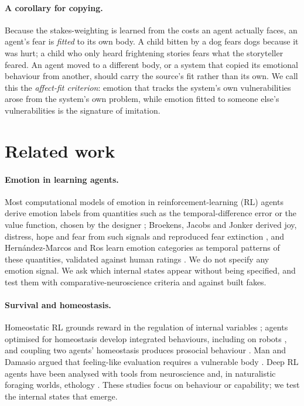 \documentclass[11pt]{article}
\begin{document}
\paragraph{A corollary for copying.} Because the stakes-weighting is learned from the costs an agent actually faces, an agent's fear is \emph{fitted} to its own body. A child bitten by a dog fears dogs because it was hurt; a child who only heard frightening stories fears what the storyteller feared. An agent moved to a different body, or a system that copied its emotional behaviour from another, should carry the source's fit rather than its own. We call this the \emph{affect-fit criterion}: emotion that tracks the system's own vulnerabilities arose from the system's own problem, while emotion fitted to someone else's vulnerabilities is the signature of imitation.

\section{Related work}
\label{sec:related}

\paragraph{Emotion in learning agents.} Most computational models of emotion in reinforcement-learning (RL) agents derive emotion labels from quantities such as the temporal-difference error or the value function, chosen by the designer \cite{moerland2018emotion}; Broekens, Jacobs and Jonker derived joy, distress, hope and fear from such signals and reproduced fear extinction \cite{broekens2015joy}, and Hern\'andez-Marcos and Ros learn emotion categories as temporal patterns of these quantities, validated against human ratings \cite{hernandezmarcos2024generic}. We do not specify any emotion signal. We ask which internal states appear without being specified, and test them with comparative-neuroscience criteria and against built fakes.

\paragraph{Survival and homeostasis.} Homeostatic RL grounds reward in the regulation of internal variables \cite{keramati2014homeostatic}; agents optimised for homeostasis develop integrated behaviours, including on robots \cite{yoshida2024emergence}, and coupling two agents' homeostasis produces prosocial behaviour \cite{yoshida2025homeostatic}. Man and Damasio argued that feeling-like evaluation requires a vulnerable body \cite{man2019homeostasis}. Deep RL agents have been analysed with tools from neuroscience \cite{wang2018prefrontal} and, in naturalistic foraging worlds, ethology \cite{simmonsedler2025deep}. These studies focus on behaviour or capability; we test the internal states that emerge.
\end{document}
